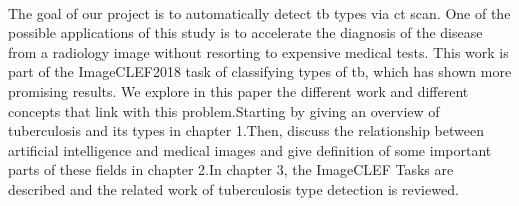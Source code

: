 \paragraph{}
The goal of our project is to automatically detect \ac{tb} types via \ac{ct} scan. One of the possible applications of this study is to accelerate the diagnosis of the disease from a radiology image without resorting to expensive medical tests. This work is part of the ImageCLEF2018  task of classifying types of \ac{tb}, which has shown more promising results. We explore in this paper the different work and different concepts that link with this problem.Starting by giving an overview of tuberculosis and its types in chapter 1.Then, discuss the relationship between artificial intelligence and medical images and give definition of some important parts of these fields in chapter 2.In chapter 3, the ImageCLEF Tasks are described and the related work of tuberculosis type detection is reviewed.